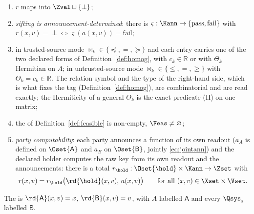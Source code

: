 \begin{definition}
\begin{enumerate}[label=D(\roman*),leftmargin=3.2em]
  Bob's emitted families enters the target conditions, and it is the only
  place it does;
\item $r$ maps into $\Zval\sqcup\{\perp\}$;
\item \emph{sifting is announcement-determined}: there is
  $\varsigma:\Kann\to\{\mathrm{pass},\mathrm{fail}\}$ with
  $r(x,v)=\perp\iff\varsigma(a(x,v))=\mathrm{fail}$;
\item in trusted-source mode $\bowtie_k\in\{\preceq,=,\succeq\}$ and
  each entry carries one of the two declared forms of
  Definition~\ref{def:homog},  with $c_k\in\mathbb{R}$ or
   with $\Theta_k$ Hermitian on $A$; in
  untrusted-source mode $\bowtie_k\in\{\le,=,\ge\}$ with
  $\Theta_k=c_k\in\mathbb{R}$. The relation symbol and the type of the
  right-hand side, which is what fixes the tag (Definition~\ref{def:homog}),
  are combinatorial and are read exactly; the Hermiticity of a general
  $\Theta_k$ is the exact predicate (H) on one matrix;
\item the  of Definition~\ref{def:feasible} is non-empty,
  $\Feas\ne\varnothing$;
\item \emph{party computability}: each party announces a function of its own
  readout ($a_A$ is defined on $\Oset{\mathsf A}$ and $a_B$ on
  $\Oset{\mathsf B}$, jointly \eqref{eq:jointann}) and the declared holder
  computes the raw key from its own readout and the announcements: there is a
  total $r_{\hold}:\Oset{\hold}\times\Kann\to\Zset$ with
  \begin{equation}\label{eq:partycomp}
    r(x,v)=r_{\hold}\big(\rd{\hold}(x,v),\,a(x,v)\big)
    \qquad\text{for all }(x,v)\in\Xset\times\Vset .
  \end{equation}
\end{enumerate}
The
is $\rd{\mathsf A}(x,v)=x$, $\rd{\mathsf B}(x,v)=v$, with $A$ labelled
$\mathsf A$ and every $\Qsys_s$ labelled $\mathsf B$.


\end{definition}
